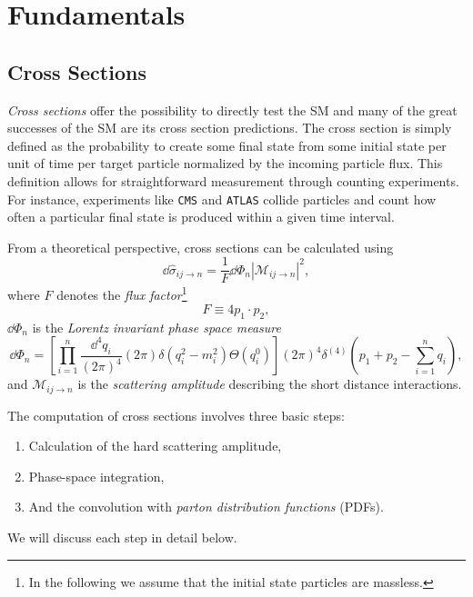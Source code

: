 
\chapter{Fundamentals}\label{chap:two}

\section{Cross Sections} \label{sec:2:cross_sections}
\textit{Cross sections} offer the possibility to directly test the \acs{SM} and many of the great successes of the \acs{SM} are its cross section predictions. The cross section is simply defined as the probability to create some final state from some initial state per unit of time per target particle normalized by the incoming particle flux. This definition allows for straightforward measurement through counting experiments. For instance, experiments like \texttt{CMS} and \texttt{ATLAS} collide particles and count how often a particular final state is produced within a given time interval.

From a theoretical perspective, cross sections can be calculated using
\begin{equation}
\dd \hat{\sigma}_{ij \rightarrow n} = \frac{1}{F} \dd \Phi_n |\mathcal{M}_{ij\rightarrow n}|^2,
\label{eq:2:Xsec}
\end{equation}
where $F$ denotes the \textit{flux factor}\footnote{In the following we assume that the initial state particles are massless.}
\begin{equation}
F \equiv 4 p_1 \cdot p_2,
\end{equation}
$\dd \Phi_n$ is the \textit{Lorentz invariant phase space measure}
\begin{equation}
\dd \Phi_n = \left[\prod_{i = 1}^n \frac{\dd^4 q_i}{(2 \pi)^4 } (2 \pi) \delta(q_i^2 - m_i^2) \Theta(q_i^0) \right] (2 \pi)^4 \delta^{(4)} \! \left(p_1 + p_2 - \sum_{i = 1}^n q_i \right),
\end{equation}
and $\mathcal{M}_{ij\rightarrow n}$ is the \textit{scattering amplitude} describing the short distance interactions.

The computation of cross sections involves three basic steps:
\begin{enumerate}
  \item Calculation of the hard scattering amplitude,
  \item Phase-space integration,
  \item And the convolution with \textit{parton distribution functions} (\acs{PDF}s).
\end{enumerate}
We will discuss each step in detail below.

